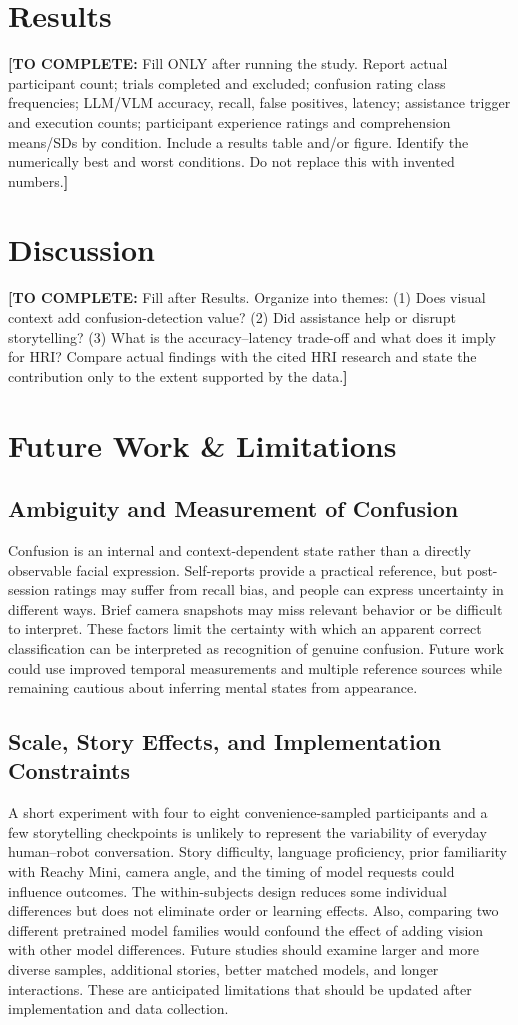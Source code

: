 \documentclass[conference]{IEEEtran}
\newcommand{\drafttodo}[1]{\par\smallskip\noindent\textcolor{red!65!black}{\textbf{[TO COMPLETE:} #1\textbf{]}}\par\smallskip}
\begin{document}
\section{Results}
\drafttodo{Fill ONLY after running the study. Report actual participant count; trials completed and excluded; confusion rating class frequencies; LLM/VLM accuracy, recall, false positives, latency; assistance trigger and execution counts; participant experience ratings and comprehension means/SDs by condition. Include a results table and/or figure. Identify the numerically best and worst conditions. Do not replace this with invented numbers.}

\section{Discussion}
\drafttodo{Fill after Results. Organize into themes: (1) Does visual context add confusion-detection value? (2) Did assistance help or disrupt storytelling? (3) What is the accuracy--latency trade-off and what does it imply for HRI? Compare actual findings with the cited HRI research and state the contribution only to the extent supported by the data.}

\section{Future Work \& Limitations}
\subsection{Ambiguity and Measurement of Confusion}
Confusion is an internal and context-dependent state rather than a directly observable facial expression. Self-reports provide a practical reference, but post-session ratings may suffer from recall bias, and people can express uncertainty in different ways. Brief camera snapshots may miss relevant behavior or be difficult to interpret. These factors limit the certainty with which an apparent correct classification can be interpreted as recognition of genuine confusion. Future work could use improved temporal measurements and multiple reference sources while remaining cautious about inferring mental states from appearance.

\subsection{Scale, Story Effects, and Implementation Constraints}
A short experiment with four to eight convenience-sampled participants and a few storytelling checkpoints is unlikely to represent the variability of everyday human--robot conversation. Story difficulty, language proficiency, prior familiarity with Reachy Mini, camera angle, and the timing of model requests could influence outcomes. The within-subjects design reduces some individual differences but does not eliminate order or learning effects. Also, comparing two different pretrained model families would confound the effect of adding vision with other model differences. Future studies should examine larger and more diverse samples, additional stories, better matched models, and longer interactions. These are anticipated limitations that should be updated after implementation and data collection.
\end{document}
